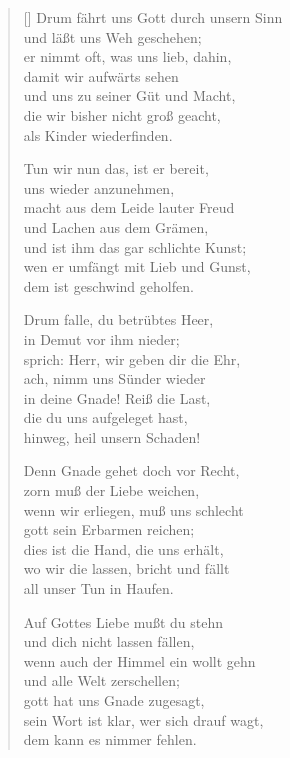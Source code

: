 \begin{multicols}{2}
\begin{verse}[\versewidth]
 Drum fährt uns Gott durch unsern Sinn\\
und läßt uns Weh geschehen;\\
er nimmt oft, was uns lieb, dahin,\\
damit wir aufwärts sehen\\
und uns zu seiner Güt und Macht,\\
die wir bisher nicht groß geacht,\\
als Kinder wiederfinden.

 Tun wir nun das, ist er bereit,\\
uns wieder anzunehmen,\\
macht aus dem Leide lauter Freud\\
und Lachen aus dem Grämen,\\
und ist ihm das gar schlichte Kunst;\\
wen er umfängt mit Lieb und Gunst,\\
dem ist geschwind geholfen.

 Drum falle, du betrübtes Heer,\\
in Demut vor ihm nieder;\\
sprich: Herr, wir geben dir die Ehr,\\
ach, nimm uns Sünder wieder\\
in deine Gnade! Reiß die Last,\\
die du uns aufgeleget hast,\\
hinweg, heil unsern Schaden!

 Denn Gnade gehet doch vor Recht,\\
zorn muß der Liebe weichen,\\
wenn wir erliegen, muß uns schlecht\\
gott sein Erbarmen reichen;\\
dies ist die Hand, die uns erhält,\\
wo wir die lassen, bricht und fällt\\
all unser Tun in Haufen.

 Auf Gottes Liebe mußt du stehn\\
und dich nicht lassen fällen,\\
wenn auch der Himmel ein wollt gehn\\
und alle Welt zerschellen;\\
gott hat uns Gnade zugesagt,\\
sein Wort ist klar, wer sich drauf wagt,\\
dem kann es nimmer fehlen.


\end{verse}
\end{multicols}
